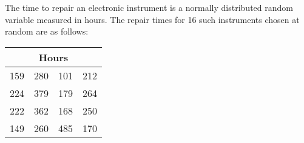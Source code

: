 \documentclass[../main.tex]{subfiles}
\begin{document}

The time to repair an electronic instrument is a normally distributed random variable measured in hours.
The repair times for 16 such instruments chosen at random are as follows:

\begin{table}[ht]
    \centering
    \begin{tabular}{llll}
    \toprule
    \multicolumn{4}{c}{\textbf{Hours}} \\ \midrule
    159     & 280    & 101    & 212    \\ 
    224     & 379    & 179    & 264    \\ 
    222     & 362    & 168    & 250    \\ 
    149     & 260    & 485    & 170    \\ \toprule
    \end{tabular}
\end{table}
\end{document}
